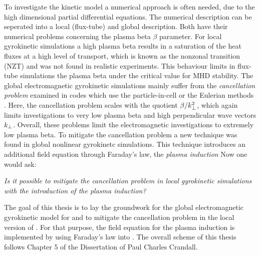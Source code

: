 To investigate the kinetic model a numerical approach is often needed, due to the high dimensional partial differential equations. The numerical description can be seperated into a local (flux-tube) and global description. Both have their numerical problems concerning the plasma beta $\beta$ parameter. For local gyrokinetic simulations a high plasma beta results in a saturation of the heat fluxes at a high level of transport, which is known as the nonzonal transition (NZT) and was not found in realistic experiments. This behaviour limits in flux-tube simulations the plasma beta under the critical value for MHD stability. The global electromagnetic gyrokinetic simulations mainly suffer from the \textit{cancellation problem} \cite{Chen2001} examined in codes which use the particle-in-cell or the Eulerian methods \cite{Cummings_PHD}. Here, the cancellation problem scales with the quotient $\beta/k_\perp^2$\cite{Mishchenko2017}, which again limits investigations to very low plasma beta and high perpendicular wave vectors $k_\perp$. Overall, these problems limit the electromagnetic investigations to extremely low plasma beta. To mitigate the cancellation problem a new technique was found in global nonlinear gyrokinetc simulations. This technique introduces an additional field equation through Faraday's law, the \textit{plasma induction} \cite{Crandall_PHD} \cite{Leppin_PHD} Now one would ask:

\bigskip
\textit{Is it possible to mitigate the cancellation problem in local gyrokinetic simulations with the introduction of the plasma induction?}
\bigskip

The goal of this thesis is to lay the groundwork for the global electromagnetic gyrokinetic model for {\gkw} and to mitigate the cancellation problem in the local version of {\gkw}. For that purpose, the field equation for the plasma induction is implemented by using Faraday's law into {\gkw}. The overall scheme of this thesis follows Chapter 5 of the Dissertation of Paul Charles Crandall\cite{Crandall_PHD}. 